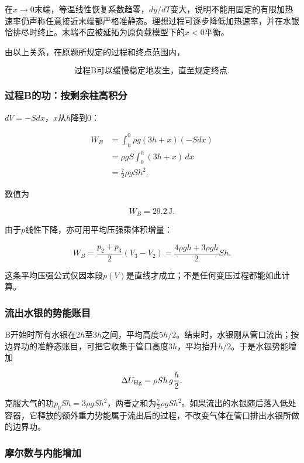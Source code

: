 \documentclass[12pt,a4paper,fontset=fandol]{ctexart}
\begin{document}
在\(x\to0\)末端，等温线性恢复系数趋零，\(dy/dT\)变大，说明不能用固定的有限加热速率仍声称任意接近末端都严格准静态。理想过程可逐步降低加热速率，并在水银恰排尽时终止。末端不应被延拓为原负载模型下的\(x<0\)平衡。

由以上关系，在原题所规定的过程和终点范围内，

\[
\boxed{\text{过程B可以缓慢稳定地发生，直至规定终点}}.
\]

\subsubsection{过程B的功：按剩余柱高积分}\label{ux8fc7ux7a0bbux7684ux529fux6309ux5269ux4f59ux67f1ux9ad8ux79efux5206}

\(dV=-Sdx\)，\(x\)从\(h\)降到0：

\[
\begin{aligned}
W_B
&=\int_h^0\rho g(3h+x)(-Sdx)\\
&=\rho gS\int_0^h(3h+x)\,dx\\
&=\frac72\rho gSh^2.
\end{aligned}
\]

数值为

\[
\boxed{W_B=29.2\,\mathrm J}.
\]

由于\(p\)线性下降，亦可用平均压强乘体积增量：

\[
W_B=\frac{p_2+p_3}{2}(V_3-V_2)
=\frac{4\rho gh+3\rho gh}{2}Sh.
\]

这条平均压强公式仅因本段\(p(V)\)是直线才成立；不是任何变压过程都能如此计算。

\subsubsection{流出水银的势能账目}\label{ux6d41ux51faux6c34ux94f6ux7684ux52bfux80fdux8d26ux76ee}

B开始时所有水银在\(2h\)至\(3h\)之间，平均高度\(5h/2\)。结束时，水银刚从管口流出；按边界功的准静态账目，可把它收集于管口高度\(3h\)，平均抬升\(h/2\)。于是水银势能增加

\[
\Delta U_{\rm Hg}=\rho Sh\,g\frac h2.
\]

克服大气的功\(p_0Sh=3\rho gSh^2\)，两者之和为\(\tfrac72\rho gSh^2\)。如果流出的水银随后落入低处容器，它释放的额外重力势能属于流出后的过程，不改变气体在管口排出水银所做的边界功。

\subsubsection{摩尔数与内能增加}\label{ux6469ux5c14ux6570ux4e0eux5185ux80fdux589eux52a0}
\end{document}
